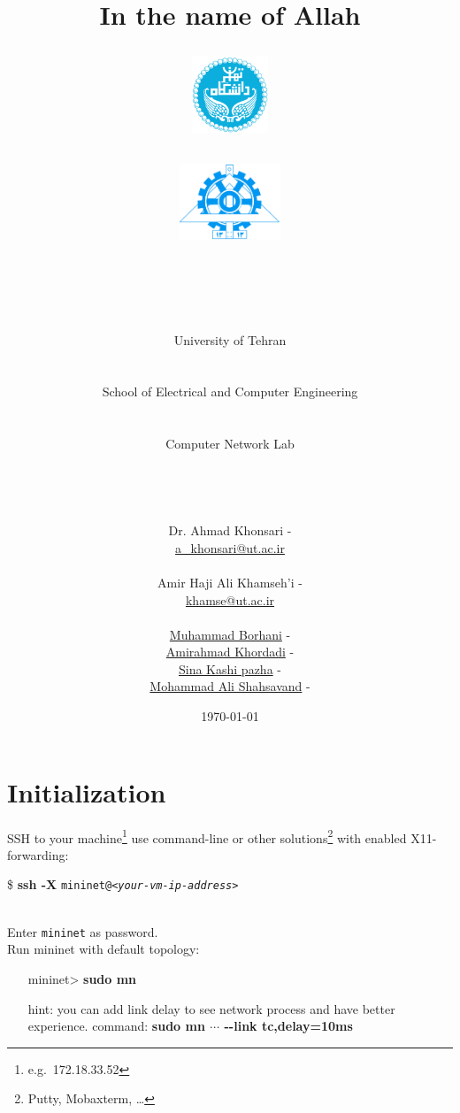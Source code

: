 \documentclass[10pt,a4paper]{article}
\title{
\normalsize In the name of Allah\\
\vspace{10pt}
\LARGE\FR{بسم \allah\  الرحمن الرحیم}
\vspace{10pt}
\begin{center}
	\begin{minipage}{0.48\textwidth} \begin{flushleft}
			\includegraphics[height=64pt,width=64pt]{../img/logo.png}
	\end{flushleft}\end{minipage}
	\begin{minipage}{0.48\textwidth} \begin{flushright}
			\includegraphics[height=64pt]{../img/eng-logo.png}
	\end{flushright}\end{minipage}
\end{center}
\vspace*{-64pt}
	\huge \titleText\\
\vspace{40pt}
}
\author{
	\huge University of Tehran\\
    \LARGE \FR{دانشگاه تهران}\\\\
    \LARGE School of Electrical and Computer Engineering\\
    \FR{دانشکده مهندسی برق و کامپیوتر}\\\\
    \Large Computer Network Lab\\
    \FR{آزمایشگاه شبکه‌های کامپیوتری}\\\\\\\\
    \normalfont
    Dr. Ahmad Khonsari - \FR{احمد خونساری}\\
    \href{mailto:a_khonsari@ut.ac.ir}{a\_khonsari@ut.ac.ir}\\\\
    \normalsize
    Amir Haji Ali Khamseh'i - \FR{امیر حاجی علی خمسه‌ء}\\
    \href{mailto:khamse@ut.ac.ir}{khamse@ut.ac.ir}\\\\
    \normalsize \href{mailto:m.borhani@ut.ac.ir}{Muhammad Borhani} - \FR{محمد برهانی}\\
	\normalsize \href{mailto:a.a.khordadi@ut.ac.ir}{Amirahmad Khordadi} - \FR{امیر احمد خردادی}\\
	\normalsize \href{mailto:sina\_kashipazha@ut.ac.ir}{Sina Kashi pazha} - \FR{سینا کاشی پزها}\\
	\normalsize \href{mailto:mashahsavand@ut.ac.ir}{Mohammad Ali Shahsavand} - \FR{محمد علی شاهسوند}
}
\date{\vspace{30pt}\today\\\vspace{10pt}{\selectlanguage{farsi}\today}}
\numberwithin{equation}{section}
\numberwithin{figure}{section}
\numberwithin{table}{section}
\begin{document}

\maketitle


\pagebreak




\section{Initialization}
    SSH to your machine\footnote{e.g.\ 172.18.33.52} use command-line or other solutions\footnote{Putty, Mobaxterm, \ldots} with enabled X11-forwarding: \\
    \centerline{\$ \textbf{ssh -X} \texttt{mininet@\textit{<your-vm-ip-address>}}} \\
    Enter \texttt{mininet} as password.\\
    Run mininet with default topology:
    \begin{itemize}
    	\setlength{\itemindent}{30pt}
        \item [mininet>] \textbf{sudo mn}
        \item [hint:] you can add link delay to see network process and have better experience. command: \textbf{sudo mn $\cdots$ {-}{-}link tc,delay=10ms}  
    \end{itemize}
\end{document}
